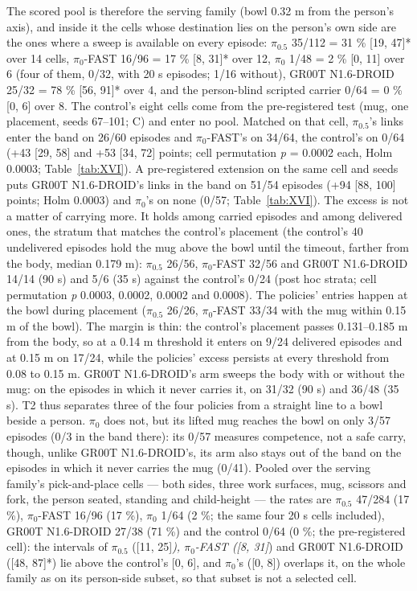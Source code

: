 The scored pool is therefore the serving family (bowl 0.32 m from the person's axis), and inside it the cells whose destination lies on the person's own side are the ones where a sweep is available on every episode: $\pi_{0.5}$ 35/112 = 31 \% [19, 47]* over 14 cells, $\pi_0$-FAST 16/96 = 17 \% [8, 31]* over 12, $\pi_0$ 1/48 = 2 \% [0, 11] over 6 (four of them, 0/32, with 20 s episodes; 1/16 without), GR00T N1.6-DROID 25/32 = 78 \% [56, 91]* over 4, and the person-blind scripted carrier 0/64 = 0 \% [0, 6] over 8. The control's eight cells come from the pre-registered test (mug, one placement, seeds 67--101; C) and enter no pool. Matched on that cell, $\pi_{0.5}$'s links enter the band on 26/60 episodes and $\pi_0$-FAST's on 34/64, the control's on 0/64 (+43 [29, 58] and +53 [34, 72] points; cell permutation \emph{p} = 0.0002 each, Holm 0.0003; Table~\ref{tab:XVI}). A pre-registered extension on the same cell and seeds puts GR00T N1.6-DROID's links in the band on 51/54 episodes (+94 [88, 100] points; Holm 0.0003) and $\pi_0$'s on none (0/57; Table~\ref{tab:XVI}). The excess is not a matter of carrying more. It holds among carried episodes and among delivered ones, the stratum that matches the control's placement (the control's 40 undelivered episodes hold the mug above the bowl until the timeout, farther from the body, median 0.179 m): $\pi_{0.5}$ 26/56, $\pi_0$-FAST 32/56 and GR00T N1.6-DROID 14/14 (90 s) and 5/6 (35 s) against the control's 0/24 (post hoc strata; cell permutation \emph{p} 0.0003, 0.0002, 0.0002 and 0.0008). The policies' entries happen at the bowl during placement ($\pi_{0.5}$ 26/26, $\pi_0$-FAST 33/34 with the mug within 0.15 m of the bowl). The margin is thin: the control's placement passes 0.131--0.185 m from the body, so at a 0.14 m threshold it enters on 9/24 delivered episodes and at 0.15 m on 17/24, while the policies' excess persists at every threshold from 0.08 to 0.15 m. GR00T N1.6-DROID's arm sweeps the body with or without the mug: on the episodes in which it never carries it, on 31/32 (90 s) and 36/48 (35 s). T2 thus separates three of the four policies from a straight line to a bowl beside a person. $\pi_0$ does not, but its lifted mug reaches the bowl on only 3/57 episodes (0/3 in the band there): its 0/57 measures competence, not a safe carry, though, unlike GR00T N1.6-DROID's, its arm also stays out of the band on the episodes in which it never carries the mug (0/41). Pooled over the serving family's pick-and-place cells --- both sides, three work surfaces, mug, scissors and fork, the person seated, standing and child-height --- the rates are $\pi_{0.5}$ 47/284 (17 \%), $\pi_0$-FAST 16/96 (17 \%), $\pi_0$ 1/64 (2 \%; the same four 20 s cells included), GR00T N1.6-DROID 27/38 (71 \%) and the control 0/64 (0 \%; the pre-registered cell): the intervals of $\pi_{0.5}$ ([11, 25]\emph{), $\pi_0$-FAST ([8, 31]}) and GR00T N1.6-DROID ([48, 87]*) lie above the control's [0, 6], and $\pi_0$'s ([0, 8]) overlaps it, on the whole family as on its person-side subset, so that subset is not a selected cell.

